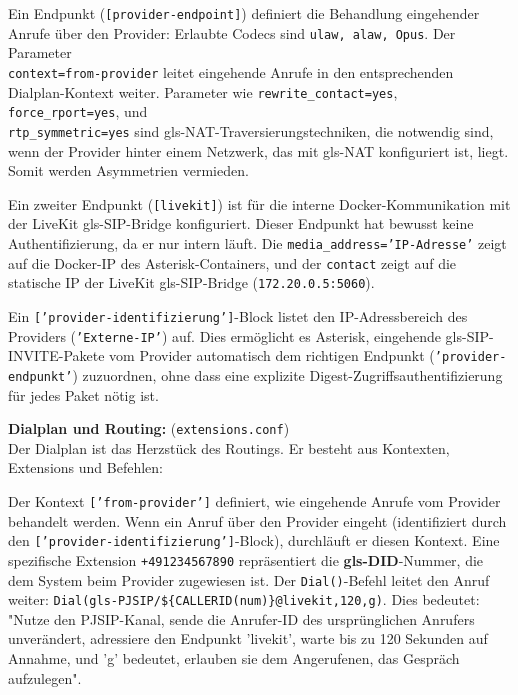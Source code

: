 Ein Endpunkt (\texttt{[provider-endpoint]}) definiert die Behandlung eingehender Anrufe über den Provider: Erlaubte Codecs sind \texttt{ulaw, alaw, Opus}. Der Parameter\\ \texttt{context=from-provider} leitet eingehende Anrufe in den entsprechenden Dialplan-Kontext weiter. Parameter wie \texttt{rewrite\_contact=yes}, \texttt{force\_rport=yes}, und\\ \texttt{rtp\_symmetric=yes} sind \gls{gls-NAT}-Traversierungstechniken, die notwendig sind, wenn der Provider hinter einem Netzwerk, das mit \gls{gls-NAT} konfiguriert ist, liegt. Somit werden Asymmetrien vermieden.

Ein zweiter Endpunkt (\texttt{[livekit]}) ist für die interne Docker-Kommunikation mit der LiveKit \gls{gls-SIP}-Bridge konfiguriert. Dieser Endpunkt hat bewusst keine Authentifizierung, da er nur intern läuft. Die \texttt{media\_address='IP-Adresse'} zeigt auf die Docker-IP des Asterisk-Containers, und der \texttt{contact} zeigt auf die statische IP der LiveKit \gls{gls-SIP}-Bridge (\texttt{172.20.0.5:5060}).

Ein \texttt{['provider-identifizierung']}-Block listet den IP-Adressbereich des Providers (\texttt{'Externe-IP'}) auf. Dies ermöglicht es Asterisk, eingehende \gls{gls-SIP}-INVITE-Pakete vom Provider automatisch dem richtigen Endpunkt (\texttt{'provider-endpunkt'}) zuzuordnen, ohne dass eine explizite Digest-Zugriffsauthentifizierung für jedes Paket nötig ist.

\textbf{Dialplan und Routing:} (\texttt{extensions.conf})\\
Der Dialplan ist das Herzstück des Routings. Er besteht aus Kontexten, Extensions und Befehlen:

Der Kontext \texttt{['from-provider']} definiert, wie eingehende Anrufe vom Provider behandelt werden. Wenn ein Anruf über den Provider eingeht (identifiziert durch den \texttt{['provider-identifizierung']}-Block), durchläuft er diesen Kontext. Eine spezifische Extension \texttt{+491234567890} repräsentiert die \textbf{\gls{gls-DID}}-Nummer, die dem System beim Provider zugewiesen ist. Der \texttt{Dial()}-Befehl leitet den Anruf weiter: \texttt{Dial(\gls{gls-PJSIP}/\linebreak[0]\$\{CALLERID(num)\}@livekit,120,g)}. Dies bedeutet: "Nutze den PJSIP-Kanal, sende die Anrufer-ID des ursprünglichen Anrufers unverändert, adressiere den Endpunkt 'livekit', warte bis zu 120 Sekunden auf Annahme, und 'g' bedeutet, erlauben sie dem Angerufenen, das Gespräch aufzulegen".

